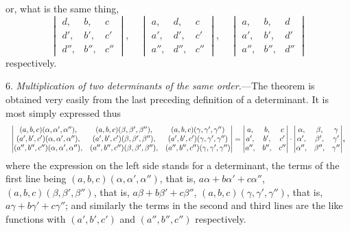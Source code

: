 \documentclass[12pt,a4paper,oneside]{book}
\begin{document}
or, what is the same thing,
\[
\begin{vmatrix} d, & b, & c \\ d', & b', & c' \\ d'', & b'', & c'' \end{vmatrix},\quad \begin{vmatrix} a, & d, & c \\ a', & d', & c' \\ a'', & d'', & c'' \end{vmatrix},\quad \begin{vmatrix} a, & b, & d \\ a', & b', & d' \\ a'', & b'', & d'' \end{vmatrix}
\]
respectively.

\newpage
6. \textit{Multiplication of two determinants of the same order.}---The theorem is obtained very easily from the last preceding definition of a determinant. It is most simply expressed thus
\[
\resizebox{\linewidth}{!}{$\displaystyle
\begin{vmatrix} (a,b,c)(\alpha,\alpha',\alpha''), & (a,b,c)(\beta,\beta',\beta''), & (a,b,c)(\gamma,\gamma',\gamma'') \\ (a',b',c')(\alpha,\alpha',\alpha''), & (a',b',c')(\beta,\beta',\beta''), & (a',b',c')(\gamma,\gamma',\gamma'') \\ (a'',b'',c'')(\alpha,\alpha',\alpha''), & (a'',b'',c'')(\beta,\beta',\beta''), & (a'',b'',c'')(\gamma,\gamma',\gamma'') \end{vmatrix}
= \begin{vmatrix} a, & b, & c \\ a', & b', & c' \\ a'', & b'', & c'' \end{vmatrix} \cdot \begin{vmatrix} \alpha, & \beta, & \gamma \\ \alpha', & \beta', & \gamma' \\ \alpha'', & \beta'', & \gamma'' \end{vmatrix}$},
\]
where the expression on the left side stands for a determinant, the terms of the first line being $(a,b,c)(\alpha,\alpha',\alpha'')$, that is, $a\alpha+b\alpha'+c\alpha''$, $(a,b,c)(\beta,\beta',\beta'')$, that is, $a\beta+b\beta'+c\beta''$, $(a,b,c)(\gamma,\gamma',\gamma'')$, that is, $a\gamma+b\gamma'+c\gamma''$; and similarly the terms in the second and third lines are the like functions with $(a',b',c')$ and $(a'',b'',c'')$ respectively.
\end{document}
